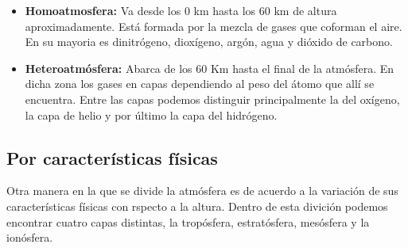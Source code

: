 \documentclass[11pt]{article}
\begin{document}
\begin{itemize}

\item\textbf{Homoatmosfera:}
Va desde los 0 km hasta los 60 km de altura aproximadamente. Está formada por la mezcla de gases que coforman el aire. En su  mayoria es dinitrógeno, dioxígeno, argón, agua y dióxido de carbono.

\item\textbf{Heteroatmósfera:}
Abarca de los 60 Km hasta el final de la atmósfera. En dicha zona los gases en capas dependiendo al peso del átomo que allí se encuentra. Entre las capas podemos distinguir principalmente la del oxígeno, la capa de helio y por último la capa del hidrógeno.

\end{itemize}

\subsection{Por características físicas}
Otra manera en la que se divide la atmósfera es de acuerdo a la variación de sus características físicas con rspecto a la altura. Dentro de esta divición podemos encontrar cuatro capas distintas, la tropósfera, estratósfera, mesósfera y la ionósfera.
\end{document}
